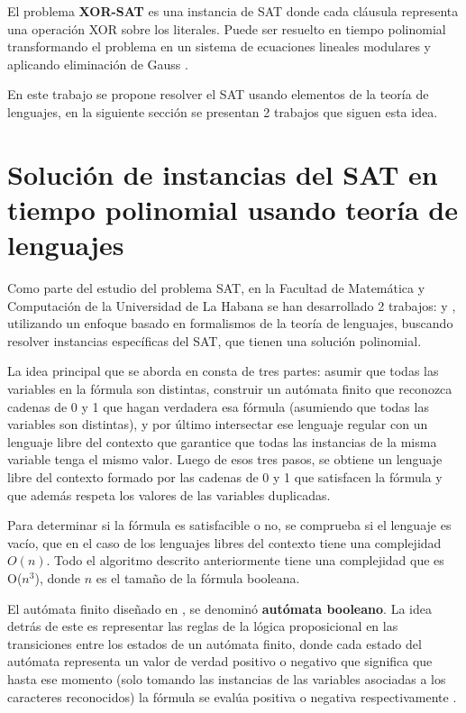 El problema \textbf{XOR-SAT} es una instancia de SAT donde cada cláusula representa una operación XOR sobre los literales. Puede ser resuelto en tiempo polinomial transformando el problema en un sistema de ecuaciones lineales modulares y aplicando eliminación de Gauss \cite{xorsatbib}.

En este trabajo se propone resolver el SAT usando elementos de la teoría de lenguajes, en la siguiente sección se 
presentan 2 trabajos que siguen esta idea.

\section{Solución de instancias del SAT en tiempo polinomial usando teoría de lenguajes}

Como parte del estudio del problema SAT, en la Facultad de Matemática y Computación de la Universidad de La Habana
se han desarrollado 2 trabajos: \cite{aCFSAT} y \cite{aSRCSAT}, utilizando un enfoque basado en formalismos de la teoría de lenguajes, buscando resolver 
instancias específicas del SAT, que tienen una solución polinomial.

La idea principal que se aborda en \cite{aCFSAT} consta de tres partes: asumir que todas las variables en la fórmula son distintas, construir un autómata finito que reconozca cadenas de 0 y 1 que hagan verdadera esa fórmula (asumiendo que todas las variables son distintas), y por último intersectar ese lenguaje regular con un lenguaje libre del contexto que garantice que todas las instancias de la misma variable tenga el mismo valor. Luego de esos tres pasos, se obtiene un lenguaje libre del contexto formado por las cadenas de 0 y 1 que satisfacen la fórmula y que además respeta los valores de las variables duplicadas.

Para determinar si la fórmula es satisfacible o no, se comprueba si el lenguaje es vacío, que en el caso de los lenguajes libres del contexto tiene una complejidad $O(n)$. Todo el algoritmo descrito anteriormente tiene una complejidad que es O($n^3$), donde $n$ es el tamaño de la fórmula booleana.

El autómata finito diseñado en \cite{aCFSAT}, se denominó \textbf{autómata booleano}. La idea detrás de este es representar las reglas de la lógica proposicional en las transiciones entre los estados de un autómata finito, donde cada estado del autómata representa un valor de verdad positivo o negativo que significa que hasta ese momento (solo tomando las instancias de las variables asociadas a los caracteres reconocidos) la fórmula se evalúa positiva o negativa respectivamente \cite{aCFSAT}.

